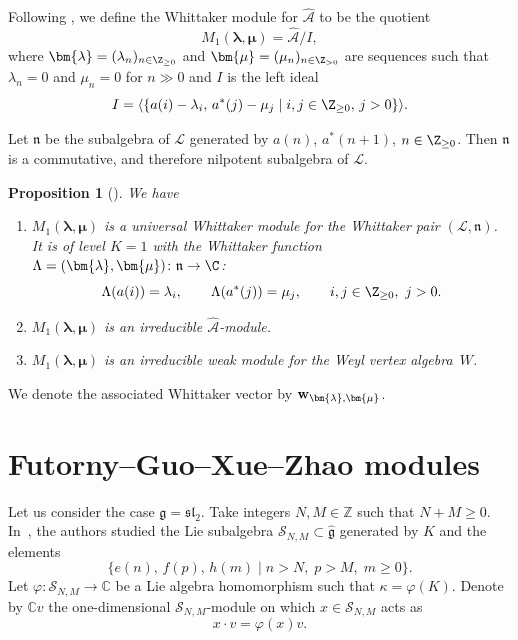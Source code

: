 \documentclass[10pt,a4paper]{amsart}
\numberwithin{equation}{section}
\newtheorem{Proposition}[Theorem]{Proposition}
\theoremstyle{definition}
\newcommand{\1}{\textbf{1}}
\begin{document}
 Following \cite{ALPY},
we define the Whittaker module for $\widehat{\mathcal{A}}$ to be the quotient \[M_1(\bm{\lambda}, \bm{\mu}) = \widehat{\mathcal{A}}/I,\]
 where $\bm{\lambda} = (\lambda_n)_{n \in {\Z}_{\ge 0}} $ and $\bm{\mu} = (\mu_n) _{n \in {\Z}_{>0}} $ are sequences such that $ \lambda_n=0$ and $\mu_n=0$ for $n \gg 0$ and $I$ is the left ideal
\[ I = \langle \{ a(i) - \lambda_i,\, a^{*}(j)-\mu_j \mid i,j \in {\Z}_{\ge 0},\, j >0\} \rangle.\]

 Let $\mathfrak n$ be the subalgebra of $\mathcal L$ generated by $a(n)$, $a^*(n+1)$, $n \in {\Z}_{\ge 0}$.
 Then $\mathfrak n$ is a commutative, and therefore nilpotent subalgebra of $\mathcal L$.

\begin{Proposition}[\cite{ALPY}] \label{standard} We have
\begin{enumerate}\itemsep=0pt
\item[$1.$] $M_1( \bm{ \lambda}, \bm{ \mu}) $ is a universal Whittaker module for the Whittaker pair $(\mathcal L, \mathfrak n)$. It is of level $K=1$ with the
Whittaker function $\Lambda = (\bm{\lambda}, \bm{\mu}) \colon \mathfrak n \rightarrow {\C}$:
\[
\Lambda(a(i)) = \lambda_i, \qquad \Lambda(a^*(j)) = \mu_j, \qquad i,j \in {\Z}_{\ge 0},\ j>0.
\]
\item[$2.$] $M_1( \bm{ \lambda}, \bm{ \mu}) $ is an irreducible $\widehat{\mathcal A}$-module.
\item[$3.$] $M_1( \bm{ \lambda}, \bm{ \mu}) $ is an irreducible weak module for the Weyl vertex algebra~$W$.
\end{enumerate}
\end{Proposition}

We denote the associated Whittaker vector by ${\bf w}_{ \bm{ \lambda}, \bm{ \mu} }$.

\section[Futorny--Guo--Xue--Zhao modules \protect{[17]}]{Futorny--Guo--Xue--Zhao modules \cite{FGXZ}}
\label{FGXZ-approach}

Let us consider the case $\mathfrak{g} = \mathfrak{sl}_{2}$.
Take integers $N, M \in \mathbb{Z}$ such that $N + M \ge 0$.
In~\cite{FGXZ}, the authors studied the Lie subalgebra
$\mathcal{S}_{N,M} \subset \widehat{\mathfrak{g}}$ generated by $K$ and the elements
\[
 \{ e(n),\, f(p),\, h(m) \mid n > N,\; p > M,\; m \ge 0 \}.
\]
Let $\varphi \colon \mathcal{S}_{N,M} \to \mathbb{C}$ be a Lie algebra homomorphism such that $\kappa = \varphi(K)$.
Denote by $\mathbb{C}v$ the one-dimensional $\mathcal{S}_{N,M}$-module on which $x \in \mathcal{S}_{N,M}$ acts as
\[
 x \cdot v = \varphi(x) v.
\]
\end{document}
